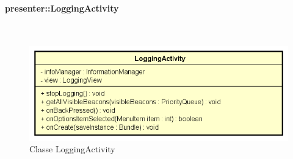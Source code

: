 \documentclass[../DefinizioneDiProdotto.tex]{subfiles}
\begin{document}
\paragraph{presenter::LoggingActivity}
\
\begin{figure}[H]
	\centering
	\includegraphics[width=\maxwidth]{img/LoggingActivity.png}
	\caption{Classe LoggingActivity}\label{fig:presenter::LoggingActivity} 
\end{figure}
\end{document}
